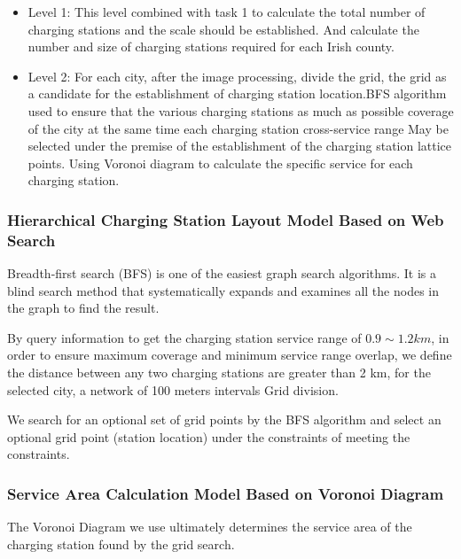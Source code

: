 \documentclass{mcmthesis}
\begin{document}
\begin{itemize}
	\item Level 1: This level combined with task 1 to calculate the total number of charging stations and the scale should be established. And calculate the number and size of charging stations required for each Irish county.
	\item Level 2: For each city, after the image processing, divide the grid, the grid as a candidate for the establishment of charging station location.BFS algorithm used to ensure that the various charging stations as much as possible coverage of the city at the same time each charging station cross-service range May be selected under the premise of the establishment of the charging station lattice points. Using Voronoi diagram to calculate the specific service for each charging station.
\end{itemize}

\subsubsection*{Hierarchical Charging Station Layout Model Based on Web Search}

\par Breadth-first search (BFS) is one of the easiest graph search algorithms. It is a blind search method that systematically expands and examines all the nodes in the graph to find the result.

\par By query information to get the charging station service range of $0.9 \sim 1.2 km$, in order to ensure maximum coverage and minimum service range overlap, we define the distance between any two charging stations are greater than 2 km, for the selected city, a network of 100 meters intervals Grid division.

\par We search for an optional set of grid points by the BFS algorithm and select an optional grid point (station location) under the constraints of meeting the constraints.

\subsubsection*{Service Area Calculation Model Based on Voronoi Diagram}

The Voronoi Diagram we use ultimately determines the service area of the charging station found by the grid search.
\end{document}
